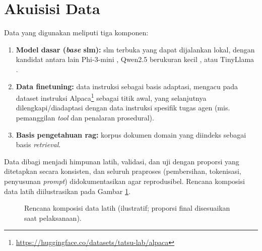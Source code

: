 \section{Akuisisi Data}
Data yang digunakan meliputi tiga komponen:
\begin{enumerate}
    \item \textbf{Model dasar (\textit{base} \gls{slm}):} \gls{slm} terbuka yang dapat dijalankan lokal, dengan kandidat antara lain Phi-3-mini \citep{abdin2024phi3}, Qwen2.5 berukuran kecil \citep{qwen2024qwen25}, atau TinyLlama \citep{zhang2024tinyllama}. %
    \item \textbf{Data \gls{finetuning}:} data instruksi sebagai basis adaptasi, mengacu pada dataset instruksi Alpaca\footnote{\url{https://huggingface.co/datasets/tatsu-lab/alpaca}} sebagai titik awal, yang selanjutnya dilengkapi/diadaptasi dengan data instruksi spesifik tugas agen (mis. pemanggilan \textit{tool} dan penalaran prosedural). %
    \item \textbf{Basis pengetahuan \gls{rag}:} korpus dokumen domain yang diindeks sebagai basis \textit{retrieval}. %
\end{enumerate}
Data dibagi menjadi himpunan latih, validasi, dan uji dengan proporsi yang ditetapkan secara konsisten, dan seluruh praproses (pembersihan, tokenisasi, penyusunan \textit{prompt}) didokumentasikan agar reprodusibel. Rencana komposisi data latih diilustrasikan pada Gambar \ref{fig:komposisi-data}.

\begin{figure}[H]
    \centering
    \caption{Rencana komposisi data latih (ilustratif; proporsi final disesuaikan saat pelaksanaan).}
    \label{fig:komposisi-data}
\end{figure}

